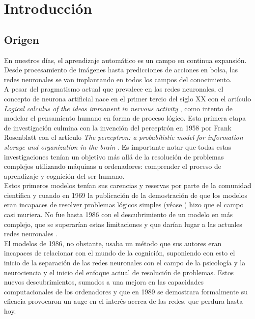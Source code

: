 
\chapter*{Introducción}

\section*{Origen}
En nuestros días, el aprendizaje automático es un campo en
continua expansión. Desde procesamiento de imágenes hasta predicciones de
acciones en bolsa, las redes neuronales se van implantando en todos los
campos del conocimiento. \\


A pesar del pragmatismo actual que prevalece en las redes 
neuronales, el concepto de neurona artificial nace en el primer tercio del siglo XX con el artículo  \textit{ Logical calculus of the ideas immanent in nervous activity} \cite{primer-articulo}, como
intento de modelar el pensamiento humano en forma de proceso lógico. Esta
primera etapa de investigación culmina con la invención del perceptrón en
1958 por Frank Rosenblatt con el artículo \textit{The perceptron: a probabilistic model for information storage and organization in the brain} \cite{rosenblatt1958perceptron}. Es importante notar que todas estas investigaciones
tenían un objetivo más allá de la resolución de problemas complejos utilizando
máquinas u ordenadores: comprender el proceso de aprendizaje y cognición del
ser humano.\\

Estos primeros modelos tenían sus carencias y reservas por parte
de la comunidad científica y cuando en 1969 la publicación de la demostración de que
los modelos eran incapaces de resolver problemas lógicos simples (véase \cite{minsky69perceptrons}) hizo que el
campo casi muriera. No fue hasta 1986 con el descubrimiento de un modelo en más complejo,
que se superarían estas limitaciones y que darían lugar a las actuales redes neuronales
\cite{10.5555/104279.104293}.\\

El modelos de 1986, no obstante, usaba un método que sus autores eran incapaces de
relacionar con el mundo de la cognición, suponiendo con esto el 
inicio de la separación de las redes neuronales con el campo de la psicología
y la neurociencia y el inicio del enfoque actual de resolución de problemas.
Estos nuevos descubrimientos, sumados a una mejora en las capacidades
computacionales de los ordenadores y que en 1989 se demostrara formalmente su eficacia \cite{HORNIK1989359} provocaron un auge en el interés acerca de
las redes, que perdura hasta hoy.\\


